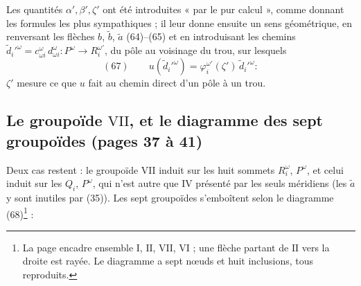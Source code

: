 \documentclass[11pt,a4paper]{article}
\begin{document}
Les quantités $\alpha', \beta', \zeta'$ ont été introduites « par le pur
calcul », comme donnant les formules les plus sympathiques ; il leur donne
ensuite un sens géométrique, en renversant les flèches $b$, $\tilde b$,
$\tilde a$ (64)–(65) et en introduisant les chemins
$\tilde d_i'^{\omega} = c^{\omega}_{\omega i}\, d^{\omega}_{\omega i} :
P^{\omega} \to R_i^{\omega'}$, du pôle au voisinage du trou, sur lesquels
\[
(67)\qquad u(\tilde d_i'^{\omega}) = \varphi_i^{\omega'}(\zeta')\, \tilde d_i'^{\omega} :
\]
$\zeta'$ mesure ce que $u$ fait au chemin direct d'un pôle à un trou.

\subsection*{Le groupoïde $\mathrm{VII}$, et le diagramme des sept groupoïdes (pages 37 à 41)}

Deux cas restent : le groupoïde $\mathrm{VII}$ induit sur les huit sommets
$R_i^{\omega}$, $P^{\omega}$, et celui induit sur les $Q_i$, $P^{\omega}$, qui
n'est autre que $\mathrm{IV}$ présenté par les seuls méridiens (les
$\tilde a$ y sont inutiles par (35)). Les sept groupoïdes s'emboîtent selon le
diagramme (68)\footnote{La page encadre ensemble $\mathrm{I}$, $\mathrm{II}$,
$\mathrm{VII}$, $\mathrm{VI}$ ; une flèche partant de $\mathrm{II}$ vers la
droite est rayée. Le diagramme a sept nœuds et huit inclusions, tous
reproduits.} :

\end{document}
